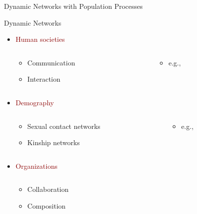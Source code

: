 \documentclass[10pt]{beamer}
\newcommand{\dd}[1]{{\textcolor{darkred}{#1}}}
\begin{document}
\begin{frame}[t]{Dynamic Networks with Population Processes}
{\begin{block}{Dynamic Networks}
\begin{itemize}
\begin{columns}
\begin{column}{0.4\textwidth}
\end{column}
\end{columns}
\item \dd{Human societies}
\vspace{-.3cm}
\begin{columns}
\begin{column}{0.4\textwidth}
\begin{itemize}
\item Communication
\item Interaction
\end{itemize}
\end{column}
\begin{column}{0.4\textwidth}
\begin{itemize}
\item e.g.,  \citet{vanderijt11,dogan09,buskens08} %
\end{itemize}
\end{column}
\end{columns}
\vspace{-.2cm}
\item \dd{Demography}
\vspace{-.3cm}
\begin{columns}
\begin{column}{0.4\textwidth}
\begin{itemize}
\item Sexual contact networks
\item Kinship networks
\end{itemize}
\end{column}
\begin{column}{0.4\textwidth}
\begin{itemize}
\item e.g.,  \citet{entwisle07,fischer82,boyd89}%
\end{itemize}
\end{column}
\end{columns}
\item \dd{Organizations}
\vspace{-.2cm}
\begin{columns}
\begin{column}{0.4\textwidth}
\begin{itemize}
\item Collaboration 
\item Composition
\end{itemize}
\end{column}
\begin{column}{0.4\textwidth}

\end{column}
\end{columns}
\end{itemize}
\end{block}}
\end{frame}
\end{document}
